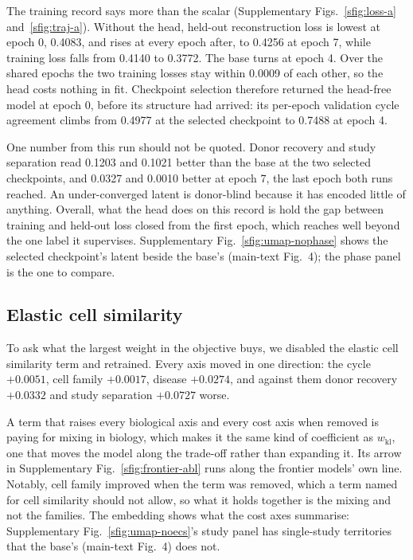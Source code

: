 The training record says more than the scalar
(Supplementary Figs.~\ref{sfig:loss-a} and~\ref{sfig:traj-a}). Without the
head, held-out reconstruction loss is lowest at epoch 0, 0.4083, and rises
at every epoch after, to 0.4256 at epoch 7, while training loss falls from
0.4140 to 0.3772. The base turns at epoch 4. Over the shared epochs the two
training losses stay within 0.0009 of each other, so the head costs nothing
in fit. Checkpoint selection therefore returned the head-free model at
epoch 0, before its structure had arrived: its per-epoch validation cycle
agreement climbs from 0.4977 at the selected checkpoint to 0.7488 at epoch
4.

One number from this run should not be quoted. Donor recovery and study
separation read 0.1203 and 0.1021 better than the base at the two selected
checkpoints, and 0.0327 and 0.0010 better at epoch 7, the last epoch both
runs reached. An under-converged latent is donor-blind because it has
encoded little of anything. Overall, what the head does on this record is
hold the gap between training and held-out loss closed from the first
epoch, which reaches well beyond the one label it supervises.
Supplementary Fig.~\ref{sfig:umap-nophase} shows the selected checkpoint's
latent beside the base's (main-text Fig.~4); the phase panel is the one to
compare.

\subsection{Elastic cell similarity}

To ask what the largest weight in the objective buys, we disabled the
elastic cell similarity term and retrained. Every axis moved in one
direction: the cycle $+0.0051$, cell family $+0.0017$, disease $+0.0274$,
and against them donor recovery $+0.0332$ and study separation $+0.0727$
worse.

A term that raises every biological axis and every cost axis when removed
is paying for mixing in biology, which makes it the same kind of
coefficient as $w_{\mathrm{kl}}$, one that moves the model along the
trade-off rather than expanding it. Its arrow in
Supplementary Fig.~\ref{sfig:frontier-abl} runs along the frontier models'
own line. Notably, cell family improved when the term was removed, which a
term named for cell similarity should not allow, so what it holds together
is the mixing and not the families. The embedding shows what the cost axes
summarise: Supplementary Fig.~\ref{sfig:umap-noecs}'s study panel has
single-study territories that the base's (main-text Fig.~4) does not.

